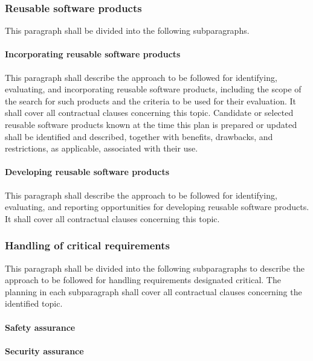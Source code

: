 \subsubsection{Reusable software products}

This paragraph shall be divided into the following subparagraphs.

\paragraph{Incorporating reusable software products}

This paragraph shall describe the approach to be followed for
identifying, evaluating, and incorporating reusable software products,
including the scope of the search for such products and the criteria to
be used for their evaluation. It shall cover all contractual clauses
concerning this topic. Candidate or selected reusable software products
known at the time this plan is prepared or updated shall be identified
and described, together with benefits, drawbacks, and restrictions, as
applicable, associated with their use.

\paragraph{Developing reusable software products}

This paragraph shall describe the approach to be followed for
identifying, evaluating, and reporting opportunities for developing
reusable software products. It shall cover all contractual clauses
concerning this topic.

\subsubsection{Handling of critical requirements}

This paragraph shall be divided into the following subparagraphs to
describe the approach to be followed for handling requirements
designated critical. The planning in each subparagraph shall cover all
contractual clauses concerning the identified topic.

\paragraph{Safety assurance}

\paragraph{Security assurance}

